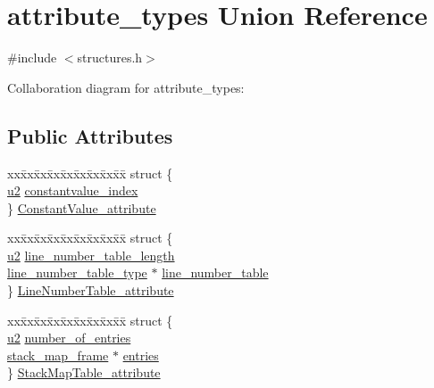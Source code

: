 \hypertarget{unionattribute__types}{}\section{attribute\+\_\+types Union Reference}
\label{unionattribute__types}


{\ttfamily \#include $<$structures.\+h$>$}



Collaboration diagram for attribute\+\_\+types\+:
\subsection*{Public Attributes}
\begin{DoxyCompactItemize}
\item 
\begin{tabbing}
xx\=xx\=xx\=xx\=xx\=xx\=xx\=xx\=xx\=\kill
struct \{\\
\>\hyperlink{structures_8h_a55ef8d87fd202b8417704c089899c5b9}{u2} \hyperlink{unionattribute__types_abec9c5f39e4bfdc4de221e4645d15754}{constantvalue\_index}\\
\} \hyperlink{unionattribute__types_aaecd67000fbd2536ca5290a26b0413b0}{ConstantValue\_attribute}\\

\end{tabbing}\item 
\begin{tabbing}
xx\=xx\=xx\=xx\=xx\=xx\=xx\=xx\=xx\=\kill
struct \{\\
\>\hyperlink{structures_8h_a55ef8d87fd202b8417704c089899c5b9}{u2} \hyperlink{unionattribute__types_acef55ed8e6d377038f26e56398715ba3}{line\_number\_table\_length}\\
\>\hyperlink{structline__number__table__type}{line\_number\_table\_type} $\ast$ \hyperlink{unionattribute__types_af9c522c40e319223069c2aa95863aef1}{line\_number\_table}\\
\} \hyperlink{unionattribute__types_ac8d1e9ca062ca40620b53e65d67b78fd}{LineNumberTable\_attribute}\\

\end{tabbing}\item 
\begin{tabbing}
xx\=xx\=xx\=xx\=xx\=xx\=xx\=xx\=xx\=\kill
struct \{\\
\>\hyperlink{structures_8h_a55ef8d87fd202b8417704c089899c5b9}{u2} \hyperlink{unionattribute__types_a27a78095d45ab77a8670fe3d9c7fd349}{number\_of\_entries}\\
\>\hyperlink{structstack__map__frame}{stack\_map\_frame} $\ast$ \hyperlink{unionattribute__types_ac00cec5af4c5a187ddd975ce5cb2bc46}{entries}\\
\} \hyperlink{unionattribute__types_af40b8d96b4ed7c185e3bbe69ce26d920}{StackMapTable\_attribute}\\


\end{tabbing}
\end{DoxyCompactItemize}
